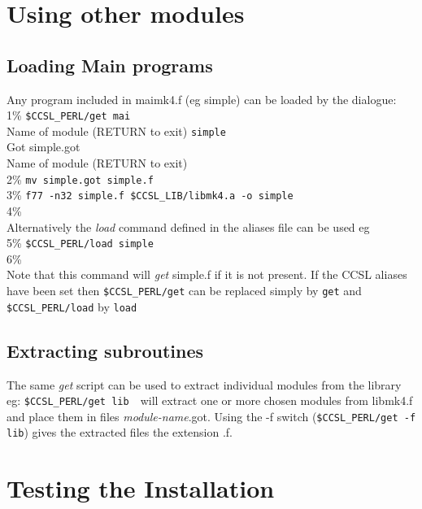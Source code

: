\documentclass[onecolumn,twoside,11pt,a4paper]{report}
\begin{document}
\section{Using other modules}
\subsection{Loading Main programs}
Any  program included in maimk4.f (eg simple) can be loaded by the 
dialogue:\\[0.2ex]
1\% \texttt{\$CCSL\_PERL/get mai}\\
 Name of module (RETURN to exit) \texttt{simple} \\  
Got simple.got\\
 Name of module (RETURN to exit)\\ 
2\% \texttt{mv simple.got simple.f}\\
3\% \texttt{f77 -n32 simple.f \$CCSL\_LIB/libmk4.a -o simple}\\
4\%\\[0.2ex] 
Alternatively the \emph{load} command defined in the aliases file can be used eg\\
5\% \texttt{\$CCSL\_PERL/load simple}\\
6\%\\[0.2ex] 
Note that this command will \emph{get} simple.f if it is not present.
If the CCSL aliases have been set then \texttt{\$CCSL\_PERL/get} can be
replaced simply by \texttt{get} and \texttt{\$CCSL\_PERL/load} by 
\texttt{load}
%
\subsection{Extracting subroutines}
The same \emph{get} script can be used to extract individual modules from the library
eg: \texttt{\$CCSL\_PERL/get lib}\  \ 
will extract one or more chosen modules from libmk4.f and place
them in  files \emph{module-name}.got.
Using  the -f switch (\texttt{\$CCSL\_PERL/get -f lib}) gives the extracted 
files the extension .f.\\
\section{Testing the Installation} 
\end{document}
